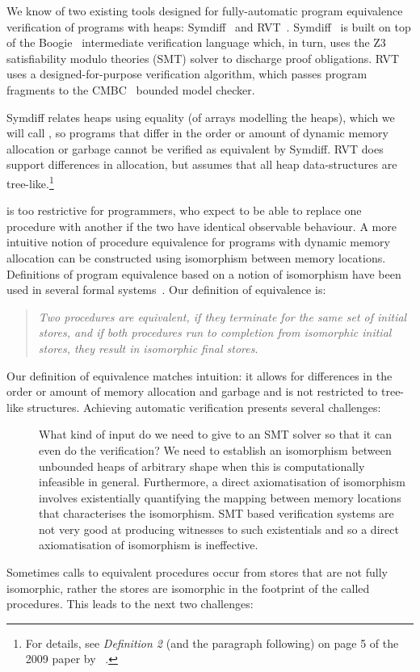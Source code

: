 \documentclass[runningheads,a4paper]{llncs}
\begin{document}
We know of two existing tools designed for fully-automatic program equivalence verification of programs with heaps: Symdiff~\cite{Lahiri2012} and RVT~\cite{Godlin09}. Symdiff~\cite{Kawaguchi2010,Lahiri2012,Lahiri2013,Hawblitzel2013} is built on top of the Boogie~\cite{Barnett2005} intermediate verification language which, in turn, uses the Z3~\cite{DeMoura2008} satisfiability modulo theories (SMT) solver to discharge proof obligations. RVT uses a designed-for-purpose verification algorithm, which passes program fragments to the CMBC~\cite{Clarke2003} bounded model checker.

Symdiff relates heaps using equality (of arrays modelling the heaps), which we will call \emph{\symdiffequivn{}}, so programs that differ in the order or amount of dynamic memory allocation or garbage cannot be verified as equivalent by Symdiff. RVT does support differences in allocation, but assumes that all heap data-structures are tree-like.\footnote{For details, see \emph{Definition 2} (and the paragraph following) on page 5 of the 2009 paper by \citeauthor{Godlin09}~\cite{Godlin09}.}

\Symdiffequivn{} is too restrictive for programmers, who expect to be able to replace one procedure with another if the two have identical observable behaviour. A more intuitive notion of procedure equivalence for programs with dynamic memory allocation can be constructed using isomorphism between memory locations. Definitions of program equivalence based on a notion of isomorphism have been used in several formal systems~\cite{Benton2007,Pitts2002}. Our definition of equivalence is:
 \begin{quote}%
 \emph{Two procedures are {\em equivalent}, if they terminate for the same set of initial stores, and if both procedures run to completion from isomorphic initial stores, they result in isomorphic final stores}. 
 \end{quote}
 Our definition of equivalence matches intuition: it allows for differences in the order or amount of memory allocation and garbage and is not restricted to tree-like structures.
Achieving automatic verification presents several challenges:
\begin{description}
\item[\Cone{}]What kind of input do we need to give to an SMT solver so that it can even do the verification? We need to establish an isomorphism between unbounded heaps of arbitrary shape when this is computationally infeasible in general. Furthermore, a direct axiomatisation of isomorphism involves existentially quantifying the mapping between memory locations that characterises the isomorphism. SMT based verification systems are not very good at producing witnesses to such existentials and so a direct axiomatisation of isomorphism is ineffective.
\end{description}
Sometimes calls to equivalent procedures occur from stores that are not fully isomorphic, rather the stores are isomorphic in the footprint of the called procedures. This leads to the next two challenges:
\end{document}
